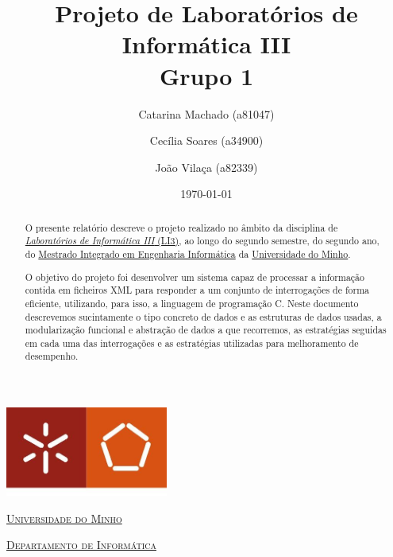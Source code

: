 \documentclass[a4paper]{article}
\begin{document}
\title{Projeto de Laboratórios de Informática III\\Grupo 1}
\author{Catarina Machado (a81047) \and Cecília Soares (a34900) \and João Vilaça (a82339)}
\date{\today}

\begin{titlepage}

  \thispagestyle{empty}
  \begin{center}
  \begin{minipage}{0.75\linewidth}
      \centering
      \includegraphics[width=0.4\textwidth]{eng.jpeg}\par\vspace{1cm}
      \vspace{1.5cm}
      \href{https://www.uminho.pt/PT}{\scshape\LARGE Universidade do Minho} \par
      \vspace{1cm}
      \href{https://www.di.uminho.pt/}{\scshape\Large Departamento de Informática} \par
      \vspace{1.5cm}

  \maketitle

  \end{minipage}
  \end{center}
  \clearpage

 \end{titlepage}


\begin{abstract}
O presente relatório descreve o projeto realizado no âmbito da disciplina de
\href{http://miei.di.uminho.pt/plano_estudos.html#laborat_rios_de_inform_tica_iii}
{\emph {Laboratórios de Informática III} (LI3)}, ao longo do segundo semestre,
do segundo ano, do \href{http://miei.di.uminho.pt}{Mestrado Integrado em Engenharia Informática}
da \href{https://www.uminho.pt}{Universidade do Minho}.

O objetivo do projeto foi desenvolver um sistema capaz de processar a informação
contida em ficheiros XML para responder a um conjunto de interrogações de forma
eficiente, utilizando, para isso, a linguagem de programação C. Neste documento
descrevemos sucintamente o tipo concreto de dados e as estruturas de dados usadas,
a modularização funcional e abstração de dados a que recorremos, as estratégias seguidas
em cada uma das interrogações e as estratégias utilizadas para melhoramento de desempenho.

\end{abstract}
\pagebreak
\end{document}
